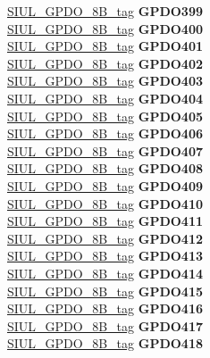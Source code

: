 \begin{DoxyCompactItemize}
\begin{tabbing}
\>\>\mbox{\hyperlink{unionSIUL__GPDO__8B__tag}{SIUL\_GPDO\_8B\_tag}} {\bfseries GPDO399}\\
\>\>\mbox{\hyperlink{unionSIUL__GPDO__8B__tag}{SIUL\_GPDO\_8B\_tag}} {\bfseries GPDO400}\\
\>\>\mbox{\hyperlink{unionSIUL__GPDO__8B__tag}{SIUL\_GPDO\_8B\_tag}} {\bfseries GPDO401}\\
\>\>\mbox{\hyperlink{unionSIUL__GPDO__8B__tag}{SIUL\_GPDO\_8B\_tag}} {\bfseries GPDO402}\\
\>\>\mbox{\hyperlink{unionSIUL__GPDO__8B__tag}{SIUL\_GPDO\_8B\_tag}} {\bfseries GPDO403}\\
\>\>\mbox{\hyperlink{unionSIUL__GPDO__8B__tag}{SIUL\_GPDO\_8B\_tag}} {\bfseries GPDO404}\\
\>\>\mbox{\hyperlink{unionSIUL__GPDO__8B__tag}{SIUL\_GPDO\_8B\_tag}} {\bfseries GPDO405}\\
\>\>\mbox{\hyperlink{unionSIUL__GPDO__8B__tag}{SIUL\_GPDO\_8B\_tag}} {\bfseries GPDO406}\\
\>\>\mbox{\hyperlink{unionSIUL__GPDO__8B__tag}{SIUL\_GPDO\_8B\_tag}} {\bfseries GPDO407}\\
\>\>\mbox{\hyperlink{unionSIUL__GPDO__8B__tag}{SIUL\_GPDO\_8B\_tag}} {\bfseries GPDO408}\\
\>\>\mbox{\hyperlink{unionSIUL__GPDO__8B__tag}{SIUL\_GPDO\_8B\_tag}} {\bfseries GPDO409}\\
\>\>\mbox{\hyperlink{unionSIUL__GPDO__8B__tag}{SIUL\_GPDO\_8B\_tag}} {\bfseries GPDO410}\\
\>\>\mbox{\hyperlink{unionSIUL__GPDO__8B__tag}{SIUL\_GPDO\_8B\_tag}} {\bfseries GPDO411}\\
\>\>\mbox{\hyperlink{unionSIUL__GPDO__8B__tag}{SIUL\_GPDO\_8B\_tag}} {\bfseries GPDO412}\\
\>\>\mbox{\hyperlink{unionSIUL__GPDO__8B__tag}{SIUL\_GPDO\_8B\_tag}} {\bfseries GPDO413}\\
\>\>\mbox{\hyperlink{unionSIUL__GPDO__8B__tag}{SIUL\_GPDO\_8B\_tag}} {\bfseries GPDO414}\\
\>\>\mbox{\hyperlink{unionSIUL__GPDO__8B__tag}{SIUL\_GPDO\_8B\_tag}} {\bfseries GPDO415}\\
\>\>\mbox{\hyperlink{unionSIUL__GPDO__8B__tag}{SIUL\_GPDO\_8B\_tag}} {\bfseries GPDO416}\\
\>\>\mbox{\hyperlink{unionSIUL__GPDO__8B__tag}{SIUL\_GPDO\_8B\_tag}} {\bfseries GPDO417}\\
\>\>\mbox{\hyperlink{unionSIUL__GPDO__8B__tag}{SIUL\_GPDO\_8B\_tag}} {\bfseries GPDO418}\\

\end{tabbing}
\end{DoxyCompactItemize}
